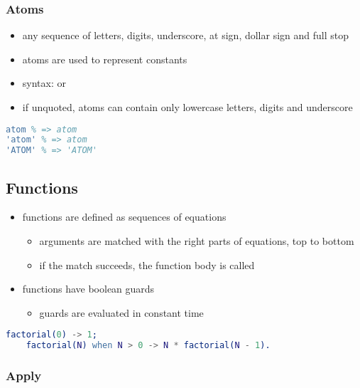 \documentclass[a4paper,landscape,10pt]{article}
\begin{document}
\begin{multicols*}{2}
  \subsubsection{Atoms}
  \label{sec:erlang-atoms}

  \begin{itemize}
    \item any sequence of letters, digits, underscore, at sign, dollar sign and full stop
    \item atoms are used to represent constants
    \item syntax:  or 
    \item if unquoted, atoms can contain only lowercase letters, digits and underscore
  \end{itemize}

  \begin{lstlisting}[language=Erlang]
atom % => atom
'atom' % => atom
'ATOM' % => 'ATOM'
\end{lstlisting}

  \breakcolumn

  \subsection{Functions}

  \begin{itemize}
    \item functions are defined as sequences of equations
          \begin{itemize}
            \item arguments are matched with the right parts of equations, top to bottom
            \item if the match succeeds, the function body is called
          \end{itemize}
    \item functions have boolean guards 
          \begin{itemize}
            \item guards are evaluated in constant time
          \end{itemize}
  \end{itemize}

  \begin{lstlisting}[language=Erlang]
    factorial(0) -> 1;
    factorial(N) when N > 0 -> N * factorial(N - 1).
  \end{lstlisting}

  \subsubsection{Apply}


\end{multicols*}
\end{document}
